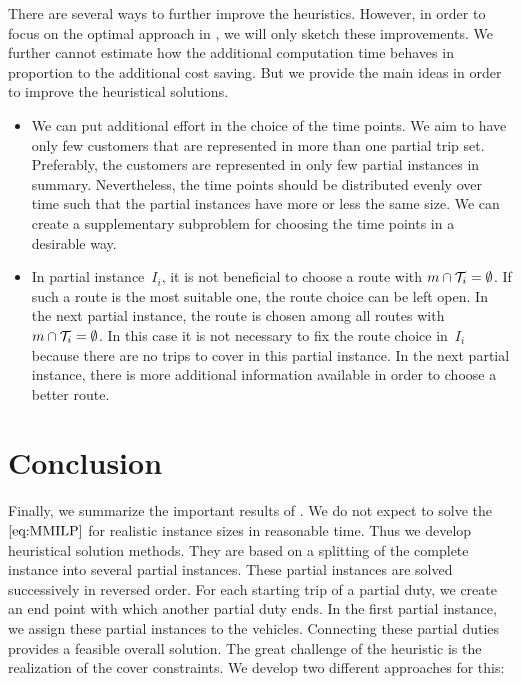 There are several ways to further improve the heuristics. However, in order to focus on the optimal approach in , we will only sketch these improvements. We further cannot estimate how the additional computation time behaves in proportion to the additional cost saving. But we provide the main ideas in order to improve the heuristical solutions.
\begin{itemize}
	\item
We can put additional effort in the choice of the time points. We aim to have only few customers that are represented in more than one partial trip set. Preferably, the customers are represented in only few partial instances in summary. Nevertheless, the time points should be distributed evenly over time such that the partial instances have more or less the same size. We can create a supplementary subproblem for choosing the time points in a desirable way.
	\item
In partial instance~$I_i$, it is not beneficial to choose a route with ${m\cap\mathcal{T}_i=\emptyset}$. If such a route is the most suitable one, the route choice can be left open. In the next partial instance, the route is chosen among all routes with ${m\cap\mathcal{T}_i=\emptyset}$. In this case it is not necessary to fix the route choice in~$I_i$ because there are no trips to cover in this partial instance. In the next partial instance, there is more additional information available in order to choose a better route.
\end{itemize}


\section{Conclusion}
\label{sec:heuristics_conclusion}

Finally, we summarize the important results of . We do not expect to solve the $\eqref{eq:MMILP}$ for realistic instance sizes in reasonable time. Thus we develop heuristical solution methods. They are based on a splitting of the complete instance into several partial instances. These partial instances are solved successively in reversed order. For each starting trip of a partial duty, we create an end point with which another partial duty ends. In the first partial instance, we assign these partial instances to the vehicles. Connecting these partial duties provides a feasible overall solution. The great challenge of the heuristic is the realization of the cover constraints. We develop two different approaches for this:

